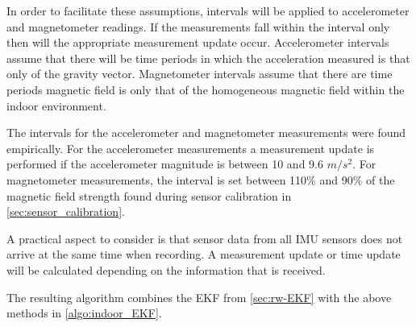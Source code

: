 In order to facilitate these assumptions, intervals will be applied to accelerometer and magnetometer readings. If the measurements fall within the interval only then will the appropriate measurement update occur. Accelerometer intervals assume that there will be time periods in which the acceleration measured is that only of the gravity vector. Magnetometer intervals assume that there are time periods magnetic field is only that of the homogeneous magnetic field within the indoor environment. \par 

The intervals for the accelerometer and magnetometer measurements were found empirically. For the accelerometer measurements a measurement update is performed if the accelerometer magnitude is between 10 and 9.6 $ m/s^2 $. For magnetometer measurements, the interval is set between 110\% and 90\% of the magnetic field strength found during sensor calibration in \cref{sec:sensor_calibration}. \par 

A practical aspect to consider is that sensor data from all IMU sensors does not arrive at the same time when recording. A measurement update or time update will be calculated depending on the information that is received. \par 

The resulting algorithm combines the EKF from \cref{sec:rw-EKF} with the above methods in \cref{algo:indoor_EKF}.

